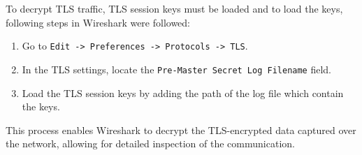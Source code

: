 To decrypt TLS traffic, TLS session keys must be loaded and to load the keys, following steps in Wireshark were followed:

\begin{enumerate}
    \item Go to \texttt{Edit -> Preferences -> Protocols -> TLS}.
    \item In the TLS settings, locate the \texttt{Pre-Master Secret Log Filename} field.
    \item Load the TLS session keys by adding the path of the log file which contain the keys.
\end{enumerate}

This process enables Wireshark to decrypt the TLS-encrypted data captured over the network, allowing for detailed inspection of the communication.









